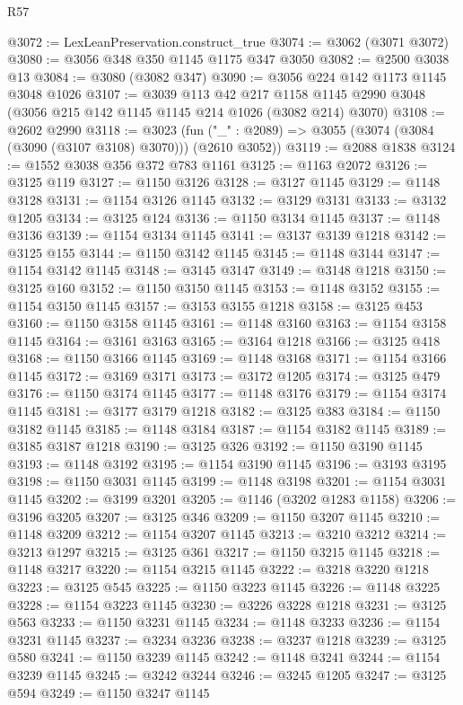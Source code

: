 \begin{lexlean}{R57}
\begin{coremodule}
@3072 := LexLeanPreservation.construct_true
@3074 := @3062 (@3071 @3072)
@3080 := @3056 @348 @350 @1145 @1175 @347 @3050
@3082 := @2500 @3038 @13
@3084 := @3080 (@3082 @347)
@3090 := @3056 @224 @142 @1173 @1145 @3048 @1026
@3107 := @3039
    @113
    @42
    @217
    @1158
    @1145
    @2990
    @3048
    (@3056 @215 @142 @1145 @1145 @214 @1026 (@3082 @214) @3070)
@3108 := @2602 @2990
@3118 := @3023
    (fun ("_" : @2089) => @3055 (@3074 (@3084 (@3090 (@3107 @3108) @3070))) (@2610 @3052))
@3119 := @2088 @1838
@3124 := @1552 @3038 @356 @372 @783 @1161
@3125 := @1163 @2072
@3126 := @3125 @119
@3127 := @1150 @3126
@3128 := @3127 @1145
@3129 := @1148 @3128
@3131 := @1154 @3126 @1145
@3132 := @3129 @3131
@3133 := @3132 @1205
@3134 := @3125 @124
@3136 := @1150 @3134 @1145
@3137 := @1148 @3136
@3139 := @1154 @3134 @1145
@3141 := @3137 @3139 @1218
@3142 := @3125 @155
@3144 := @1150 @3142 @1145
@3145 := @1148 @3144
@3147 := @1154 @3142 @1145
@3148 := @3145 @3147
@3149 := @3148 @1218
@3150 := @3125 @160
@3152 := @1150 @3150 @1145
@3153 := @1148 @3152
@3155 := @1154 @3150 @1145
@3157 := @3153 @3155 @1218
@3158 := @3125 @453
@3160 := @1150 @3158 @1145
@3161 := @1148 @3160
@3163 := @1154 @3158 @1145
@3164 := @3161 @3163
@3165 := @3164 @1218
@3166 := @3125 @418
@3168 := @1150 @3166 @1145
@3169 := @1148 @3168
@3171 := @1154 @3166 @1145
@3172 := @3169 @3171
@3173 := @3172 @1205
@3174 := @3125 @479
@3176 := @1150 @3174 @1145
@3177 := @1148 @3176
@3179 := @1154 @3174 @1145
@3181 := @3177 @3179 @1218
@3182 := @3125 @383
@3184 := @1150 @3182 @1145
@3185 := @1148 @3184
@3187 := @1154 @3182 @1145
@3189 := @3185 @3187 @1218
@3190 := @3125 @326
@3192 := @1150 @3190 @1145
@3193 := @1148 @3192
@3195 := @1154 @3190 @1145
@3196 := @3193 @3195
@3198 := @1150 @3031 @1145
@3199 := @1148 @3198
@3201 := @1154 @3031 @1145
@3202 := @3199 @3201
@3205 := @1146 (@3202 @1283 @1158)
@3206 := @3196 @3205
@3207 := @3125 @346
@3209 := @1150 @3207 @1145
@3210 := @1148 @3209
@3212 := @1154 @3207 @1145
@3213 := @3210 @3212
@3214 := @3213 @1297
@3215 := @3125 @361
@3217 := @1150 @3215 @1145
@3218 := @1148 @3217
@3220 := @1154 @3215 @1145
@3222 := @3218 @3220 @1218
@3223 := @3125 @545
@3225 := @1150 @3223 @1145
@3226 := @1148 @3225
@3228 := @1154 @3223 @1145
@3230 := @3226 @3228 @1218
@3231 := @3125 @563
@3233 := @1150 @3231 @1145
@3234 := @1148 @3233
@3236 := @1154 @3231 @1145
@3237 := @3234 @3236
@3238 := @3237 @1218
@3239 := @3125 @580
@3241 := @1150 @3239 @1145
@3242 := @1148 @3241
@3244 := @1154 @3239 @1145
@3245 := @3242 @3244
@3246 := @3245 @1205
@3247 := @3125 @594
@3249 := @1150 @3247 @1145

\end{coremodule}
\end{lexlean}
